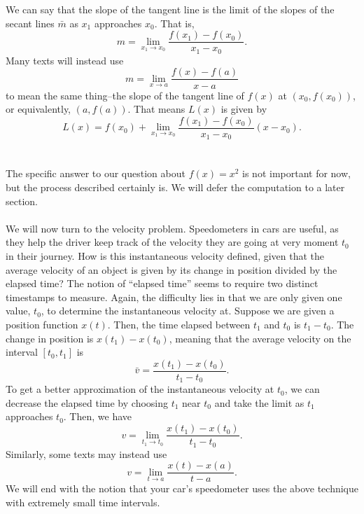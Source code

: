         \vphantom
        \\
        \\
        We can say that the slope of the tangent line is the limit of the slopes of the secant lines \(\bar{m}\) as \(x_1\) approaches \(x_0\). That is,
        \begin{equation*}
            m=\lim_{x_1\to x_0}\frac{f(x_1)-f(x_0)}{x_1-x_0}.
        \end{equation*}
        Many texts will instead use
        \begin{equation*}
            m=\lim_{x\to a}\frac{f(x)-f(a)}{x-a}
        \end{equation*}
        to mean the same thing--the slope of the tangent line of \(f(x)\) at \((x_0,f(x_0))\), or equivalently, \((a,f(a))\). That means \(L(x)\) is given by
        \begin{equation*}
            L(x)=f(x_0)+\lim_{x_1\to x_0}\frac{f(x_1)-f(x_0)}{x_1-x_0}(x-x_0).
        \end{equation*}
        \\
        \\
        The specific answer to our question about \(f(x)=x^2\) is not important for now, but the process described certainly is. We will defer the computation to a later section.
        \pagebreak
        \\
        \\
        We will now turn to the velocity problem. Speedometers in cars are useful, as they help the driver keep track of the velocity they are going at very moment \(t_0\) in their journey. How is this instantaneous velocity defined, given that the average velocity of an object is given by its change in position divided by the elapsed time? The notion of ``elapsed time'' seems to require two distinct timestamps to measure. Again, the difficulty lies in that we are only given one value, \(t_0\), to determine the instantaneous velocity at. Suppose we are given a position function \(x(t)\). Then, the time elapsed between \(t_1\) and \(t_0\) is \(t_1-t_0\). The change in position is \(x(t_1)-x(t_0)\), meaning that the average velocity on the interval \([t_0,t_1]\) is
        \begin{equation*}
            \bar{v}=\frac{x(t_1)-x(t_0)}{t_1-t_0}.
        \end{equation*}
        To get a better approximation of the instantaneous velocity at \(t_0\), we can decrease the elapsed time by choosing \(t_1\) near \(t_0\) and take the limit as \(t_1\) approaches \(t_0\). Then, we have
        \begin{equation*}
            v=\lim_{t_1\to t_0}\frac{x(t_1)-x(t_0)}{t_1-t_0}.
        \end{equation*}
        Similarly, some texts may instead use
        \begin{equation*}
            v=\lim_{t\to a}\frac{x(t)-x(a)}{t-a}.
        \end{equation*}
        We will end with the notion that your car's speedometer uses the above technique with extremely small time intervals.

